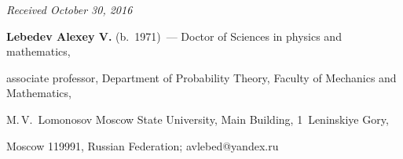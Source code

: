 







\vspace*{-3pt}





\hfill{\small\textit{Received October 30, 2016}}





\Contrl








\noindent


\textbf{Lebedev Alexey V.} (b.\ 1971)~--- Doctor of Sciences in physics and mathematics,


associate professor, Department of Probability Theory, Faculty of Mechanics and Mathematics,


M.\,V.~Lomonosov Moscow State University, Main Building, 1~Leninskiye Gory, 


Moscow 119991, Russian Federation; \mbox{avlebed@yandex.ru}





\label{end\stat}








\renewcommand{\bibname}{\protect\rm Литература}


